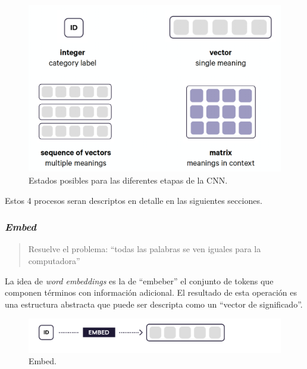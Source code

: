 \documentclass[12pt,a4paper,]{scrartcl}
\begin{document}
\begin{figure}[H]

{\centering \includegraphics{assets/deep-learning-formula-nlp_shapes.pdf} 

}

\caption{Estados posibles para las diferentes etapas de la CNN.}\label{fig:formula-shapes}
\end{figure}

Estos 4 procesos seran descriptos en detalle en las siguientes secciones.

\hypertarget{embed}{%
\subsubsection{\texorpdfstring{\emph{Embed}}{Embed}}\label{embed}}

\begin{quote}
Resuelve el problema: \enquote{todas las palabras se ven iguales para la computadora}
\end{quote}

La idea de \emph{word embeddings} es la de \enquote{embeber} el conjunto de tokens que componen términos con información adicional. El resultado de esta operación es una estructura abstracta que puede ser descripta como un \enquote{vector de significado}.

\begin{figure}[H]

{\centering \includegraphics{assets/deep-learning-formula-nlp_embed.pdf} 

}

\caption{Embed.}\label{fig:formula-embed}
\end{figure}
\end{document}
